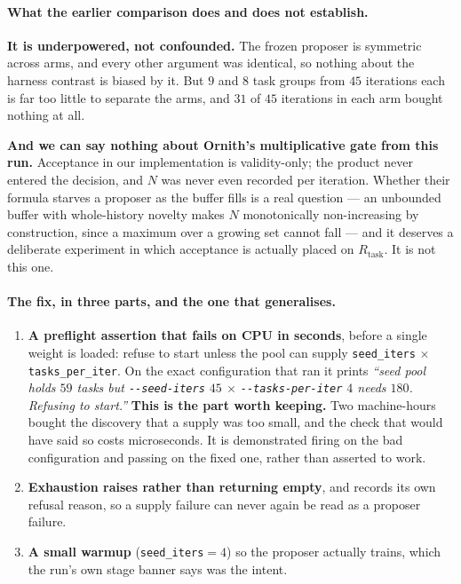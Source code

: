 \paragraph{What the earlier comparison does and does not establish.} \textbf{It is
underpowered, not confounded.} The frozen proposer is symmetric across arms, and every other
argument was identical, so nothing about the harness contrast is biased by it. But $9$ and $8$
task groups from $45$ iterations each is far too little to separate the arms, and $31$ of $45$
iterations in each arm bought nothing at all.

\textbf{And we can say nothing about Ornith's multiplicative gate from this run.} Acceptance
in our implementation is validity-only; the product never entered the decision, and $N$ was
never even recorded per iteration. Whether their formula starves a proposer as the buffer fills
is a real question --- an unbounded buffer with whole-history novelty makes $N$ monotonically
non-increasing by construction, since a maximum over a growing set cannot fall --- and it
deserves a deliberate experiment in which acceptance is actually placed on $R_{\text{task}}$.
It is not this one.

\paragraph{The fix, in three parts, and the one that generalises.}
\begin{enumerate}
\item \textbf{A preflight assertion that fails on CPU in seconds}, before a single weight is
loaded: refuse to start unless the pool can supply \texttt{seed\_iters} $\times$
\texttt{tasks\_per\_iter}. On the exact configuration that ran it prints \emph{``seed pool holds
$59$ tasks but \texttt{-{}-seed-iters} $45$ $\times$ \texttt{-{}-tasks-per-iter} $4$ needs
$180$. Refusing to start.''} \textbf{This is the part worth keeping.} Two machine-hours bought
the discovery that a supply was too small, and the check that would have said so costs
microseconds. It is demonstrated firing on the bad configuration and passing on the fixed one,
rather than asserted to work.
\item \textbf{Exhaustion raises rather than returning empty}, and records its own refusal
reason, so a supply failure can never again be read as a proposer failure.
\item \textbf{A small warmup} (\texttt{seed\_iters}$=4$) so the proposer actually trains, which
the run's own stage banner says was the intent.
\end{enumerate}

